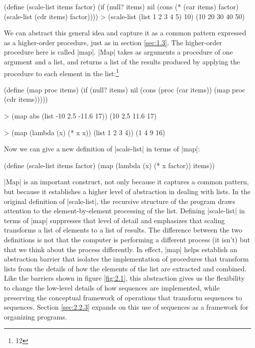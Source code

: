 \begin{schemedisplay}
(define (scale-list items factor)
  (if (null? items)
      nil
      (cons (* (car items) factor)
            (scale-list (cdr items) factor))))
> (scale-list (list 1 2 3 4 5) 10)
(10 20 30 40 50)
\end{schemedisplay}

We can abstract this general idea and capture it as a common pattern
expressed as a higher-order procedure, just as in section
\ref{sec:1.3}.  The higher-order procedure here is called
\scheme|map|.  \scheme|Map| takes as arguments a procedure of one
argument and a list, and returns a list of the results produced by
applying the procedure to each element in the list:\footnote{12}

\begin{schemedisplay}
(define (map proc items)
  (if (null? items)
      nil
      (cons (proc (car items))
            (map proc (cdr items)))))

> (map abs (list -10 2.5 -11.6 17))
(10 2.5 11.6 17)

> (map (lambda (x) (* x x))
       (list 1 2 3 4))
(1 4 9 16)
\end{schemedisplay}
Now we can give a new definition of \scheme|scale-list| in terms of \scheme|map|:
\begin{schemedisplay}
(define (scale-list items factor)
  (map (lambda (x) (* x factor))
       items))
\end{schemedisplay}


\scheme|Map| is an important construct, not only because it captures a
common pattern, but because it establishes a higher level of
abstraction in dealing with lists.  In the original definition of
\scheme|scale-list|, the recursive structure of the program draws
attention to the element-by-element processing of the list.  Defining
\scheme|scale-list| in terms of \scheme|map| suppresses that level of
detail and emphasizes that scaling transforms a list of elements to a
list of results.  The difference between the two definitions is not
that the computer is performing a different process (it isn't) but
that we think about the process differently.  In effect, \scheme|map|
helps establish an abstraction barrier that isolates the
implementation of procedures that transform lists from the details of
how the elements of the list are extracted and combined.  Like the
barriers shown in figure \ref{fig:2.1}, this abstraction gives us the
flexibility to change the low-level details of how sequences are
implemented, while preserving the conceptual framework of operations
that transform sequences to sequences.  Section \ref{sec:2.2.3}
expands on this use of sequences as a framework for organizing
programs.

